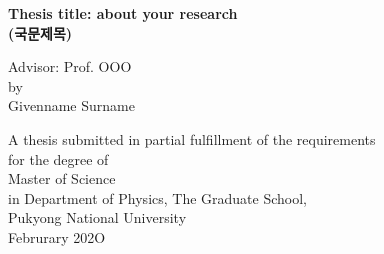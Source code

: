 \thispagestyle{empty}

\begin{center}
{\fontsize{22pt}{22}\selectfont
\textbf{Thesis title: about your research\\
    (국문제목)}\\[1.5cm]}

{\fontsize{12pt}{14}\selectfont
Advisor: Prof. OOO}\\[1.5cm]

{\fontsize{14pt}{14}\selectfont
by\\
Givenname Surname\\[4cm]}

{\fontsize{12pt}{14}\selectfont
A thesis submitted in partial fulfillment of the requirements\\
for the degree of}\\[1cm]
{\fontsize{12pt}{14}\selectfont
Master of Science}\\[1cm]
{\fontsize{12pt}{14}\selectfont
in Department of Physics, The Graduate School,\\
Pukyong National University}\\[1cm]
{\fontsize{12pt}{14}\selectfont
Februrary 202O}\\[1cm]
\end{center}

\newpage
